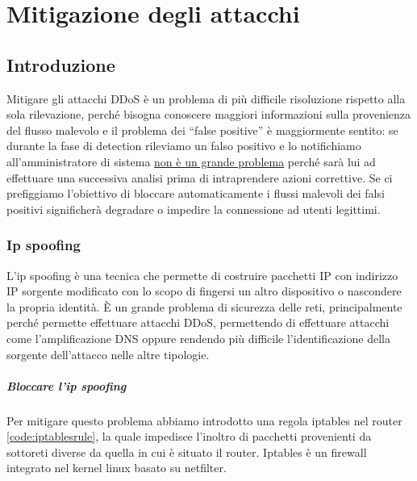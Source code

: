 \chapter{Mitigazione degli attacchi}


\section{Introduzione}

Mitigare gli attacchi DDoS è un problema di più difficile risoluzione rispetto alla sola rilevazione, perché bisogna conoscere maggiori informazioni sulla provenienza del flusso malevolo e il problema dei ``false positive'' è maggiormente sentito: se durante la fase di detection rileviamo un falso positivo e lo notifichiamo all'amministratore di sistema \underline{non è un grande problema} perché sarà lui ad effettuare una successiva analisi prima di intraprendere azioni correttive. Se ci prefiggiamo l'obiettivo di bloccare automaticamente i flussi malevoli dei falsi positivi significherà degradare o impedire la connessione ad utenti legittimi.

\subsection{Ip spoofing}

L'ip spoofing è una tecnica che permette di costruire pacchetti IP con indirizzo IP sorgente modificato con lo scopo di fingersi un altro dispositivo o nascondere la propria identità. È un grande problema di sicurezza delle reti, principalmente perché permette effettuare attacchi DDoS, permettendo di effettuare attacchi come l'amplificazione DNS oppure rendendo più difficile l'identificazione della sorgente dell'attacco nelle altre tipologie.



\paragraph{Bloccare l'ip spoofing}
Per mitigare questo problema abbiamo introdotto una regola iptables nel router \ref{code:iptablesrule}, la quale impedisce l'inoltro di pacchetti provenienti da sottoreti diverse da quella in cui è situato il router.
Iptables è un firewall integrato nel kernel linux basato su netfilter.

